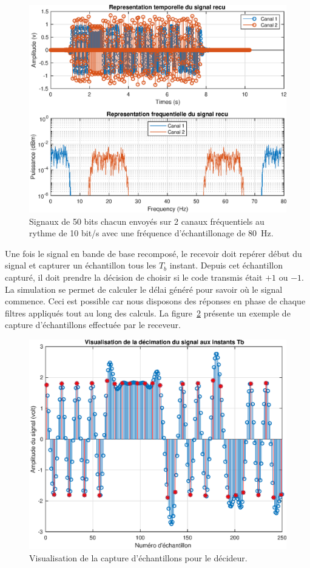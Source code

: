 \documentclass[10pt, oneside, a4paper]{article}
\begin{document}
\begin{figure}[p]
    \centering
    \includegraphics[height=0.45\textheight]{eps/receiver.eps}
    \caption{Signaux de 50 bits chacun envoyés sur 2 canaux fréquentiels au rythme de 10 bit/s
             avec une fréquence d'échantillonage de \SI{80}{\hertz}.}
    \label{fig:receiver}
\end{figure}

Une fois le signal en bande de base recomposé, le recevoir doit repérer début du signal et capturer un échantillon tous les $T_b$ instant.
Depuis cet échantillon capturé, il doit prendre la décision de choisir si le code transmis était $+1$ ou $-1$.
La simulation se permet de calculer le délai généré pour savoir où le signal commence.
Ceci est possible car nous disposons des réponses en phase de chaque filtres appliqués tout au long des calculs.
La figure~\ref{fig:decimate} présente un exemple de capture d'échantillons effectuée par le receveur.

\begin{figure}[p]
    \centering
    \includegraphics[height=0.45\textheight]{eps/decimate.eps}
    \caption{Visualisation de la capture d'échantillons pour le décideur.}
    \label{fig:decimate}
\end{figure}
\end{document}
